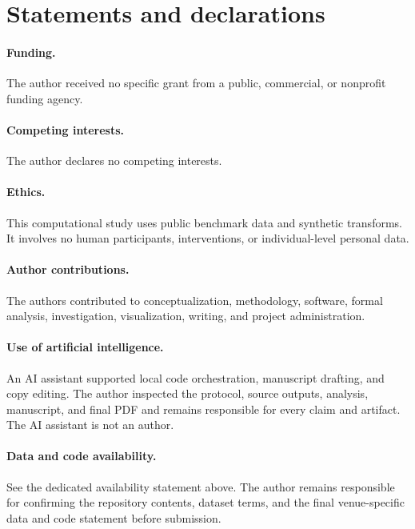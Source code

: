 \documentclass[11pt]{article}
\begin{document}
\section*{Statements and declarations}
\paragraph{Funding.} The author received no specific grant from a public, commercial, or nonprofit funding agency.

\paragraph{Competing interests.} The author declares no competing interests.

\paragraph{Ethics.} This computational study uses public benchmark data and synthetic transforms. It involves no human participants, interventions, or individual-level personal data.

\paragraph{Author contributions.} The authors contributed to conceptualization, methodology, software, formal analysis, investigation, visualization, writing, and project administration.

\paragraph{Use of artificial intelligence.} An AI assistant supported local code orchestration, manuscript drafting, and copy editing. The author inspected the protocol, source outputs, analysis, manuscript, and final PDF and remains responsible for every claim and artifact. The AI assistant is not an author.

\paragraph{Data and code availability.} See the dedicated availability statement above. The author remains responsible for confirming the repository contents, dataset terms, and the final venue-specific data and code statement before submission.



\end{document}
